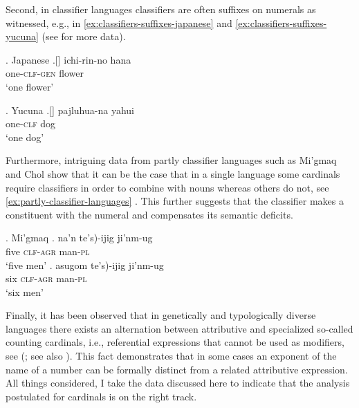 	Second, in classifier languages classifiers are often suffixes on numerals as witnessed, e.g., in \ref{ex:classifiers-suffixes-japanese} and \ref{ex:classifiers-suffixes-yucuna} (see \citealt{aikhenvald2000classifiers} for more data).
	
	\ex. Japanese \citep{sudo2016semantic}\label{ex:classifiers-suffixes-japanese}
	\bg.[] ichi-rin-no hana\\
	one-\textsc{clf}-\textsc{gen} flower\\
	`one flower'
	
	\ex. Yucuna \citep[p. 106]{aikhenvald2000classifiers}\label{ex:classifiers-suffixes-yucuna}
	\bg.[] pajluhua-na yahui\\
	one-\textsc{clf} dog\\
	`one dog'
	
	Furthermore, intriguing data from partly classifier languages such as Mi'gmaq and Chol show that it can be the case that in a single language some cardinals require classifiers in order to combine with nouns whereas others do not, see \ref{ex:partly-classifier-languages} \citep{bale_coon2014classifiers}. This further suggests that the classifier makes a constituent with the numeral and compensates its semantic deficits.
	
	\ex. Mi'gmaq \citep{bale_coon2014classifiers}\label{ex:partly-classifier-languages}
	\ag. na'n \minsp{(*} te's)-ijig ji'nm-ug\\
	five {} \textsc{clf}-\textsc{agr} man-\textsc{pl}\\
	`five men'
	\bg. asugom \minsp{*(} te's)-ijig ji'nm-ug\\
	six {} \textsc{clf}-\textsc{agr} man-\textsc{pl}\\
	`six men'

	Finally, it has been observed that in genetically and typologically diverse languages there exists an alternation between attributive and specialized so-called counting cardinals, i.e., referential expressions that cannot be used as modifiers, see  (\citealt{hurford1998interaction,hurford2001languages}; see also \citealt{wagiel_caha2020universal}). This fact demonstrates that in some cases an exponent of the name of a number can be formally distinct from a related attributive expression. All things considered, I take the data discussed here to indicate that the analysis postulated for cardinals is on the right track.

